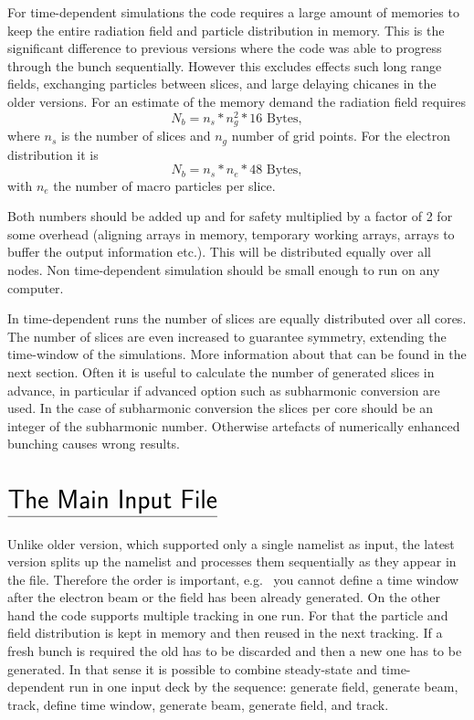\documentclass[12pt]{book}
\begin{document}
For time-dependent simulations the code requires a large amount of memories to keep the entire radiation field and particle distribution in memory. This is the significant difference to previous versions where the code was able to progress through the bunch sequentially. However this excludes effects such long range fields, exchanging particles between slices, and large delaying chicanes in the older versions. For an estimate of the memory demand the radiation field requires
\begin{displaymath}
N_b=n_s*n_g^2*16\mbox{~Bytes},
\end{displaymath}
where $n_s$ is the number of slices and $n_g$ number of grid points. For the electron distribution it is
\begin{displaymath}
N_b=n_s*n_e*48\mbox{~Bytes},
\end{displaymath}
with $n_e$ the number of macro particles per slice.

Both numbers should be added up and for safety multiplied by a factor of 2 for some overhead (aligning arrays in memory, temporary working arrays, arrays to buffer the output information etc.). This will be distributed equally over all nodes.
Non time-dependent simulation should be small enough to run on any computer.

In time-dependent runs the number of slices are equally distributed over all cores. The number of slices are even increased to guarantee symmetry, extending the time-window of the simulations. More information about that can be found in the next section. Often it is useful to calculate the number of generated slices in advance, in particular if advanced option such as subharmonic conversion are used. In the case of subharmonic conversion the slices per core should be an integer of the subharmonic number. Otherwise artefacts of numerically enhanced bunching causes wrong results.




\chapter*{\vspace{-3cm}$\underline{\mbox{\rule[-0.5em]{0cm}{1em}\huge\sf The Main Input File}}$}
 

Unlike older version, which supported only a single namelist as input, the latest version splits up the namelist and processes them sequentially as they appear in the file. Therefore the order is important, e.g.~ you cannot define a time window after the electron beam or the field has been already generated. On the other hand the code supports multiple tracking in one run. For that the particle and field distribution is kept in memory and then reused in the next tracking. If a fresh bunch is required the old has to be discarded and then a new one has to be generated.  In that sense it is possible to combine steady-state and time-dependent run in one input deck by the sequence: generate field, generate beam, track, define time window, generate beam, generate field, and track.
\end{document}
